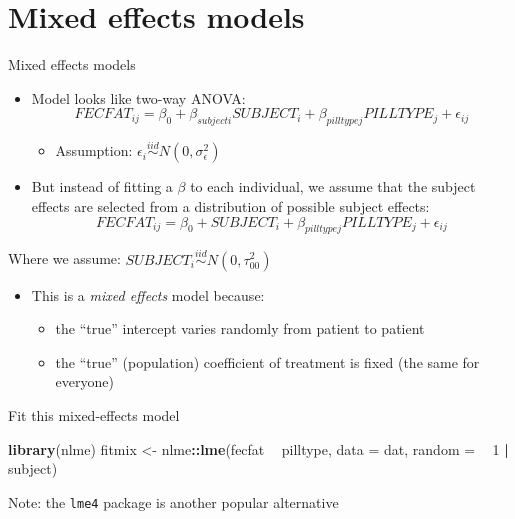 \documentclass[
  ignorenonframetext,
]{beamer}
\newenvironment{Shaded}{\begin{snugshade}}{\end{snugshade}}
\newcommand{\DataTypeTok}[1]{\textcolor[rgb]{0.13,0.29,0.53}{#1}}
\newcommand{\DecValTok}[1]{\textcolor[rgb]{0.00,0.00,0.81}{#1}}
\newcommand{\KeywordTok}[1]{\textcolor[rgb]{0.13,0.29,0.53}{\textbf{#1}}}
\newcommand{\NormalTok}[1]{#1}
\newcommand{\OperatorTok}[1]{\textcolor[rgb]{0.81,0.36,0.00}{\textbf{#1}}}
\newcommand{\StringTok}[1]{\textcolor[rgb]{0.31,0.60,0.02}{#1}}
\providecommand{\tightlist}{%
  \setlength{\itemsep}{0pt}\setlength{\parskip}{0pt}}
\begin{document}
\hypertarget{mixed-effects-models}{%
\section{Mixed effects models}\label{mixed-effects-models}}

\begin{frame}{Mixed effects models}
\protect\hypertarget{mixed-effects-models-1}{}

\begin{itemize}
\tightlist
\item
  Model looks like two-way ANOVA: \[
  FECFAT_{ij} = \beta_0 + \beta_{subject i} SUBJECT_i + \beta_{pilltype j} PILLTYPE_j + \epsilon_{ij}
  \]

  \begin{itemize}
  \tightlist
  \item
    Assumption:
    \(\epsilon_i \stackrel{iid}{\sim} N(0, \sigma_\epsilon^2)\)
  \end{itemize}
\item
  But instead of fitting a \(\beta\) to each individual, we assume that
  the subject effects are selected from a distribution of possible
  subject effects: \[
  FECFAT_{ij} = \beta_0 + SUBJECT_i + \beta_{pilltype j} PILLTYPE_j + \epsilon_{ij}
  \]
\end{itemize}

Where we assume: \(SUBJECT_i \stackrel{iid}{\sim} N(0, \tau_{00}^2)\)

\begin{itemize}
\tightlist
\item
  This is a \emph{mixed effects} model because:

  \begin{itemize}
  \tightlist
  \item
    the ``true'' intercept varies randomly from patient to patient
  \item
    the ``true'' (population) coefficient of treatment is fixed (the
    same for everyone)
  \end{itemize}
\end{itemize}

\end{frame}

\begin{frame}[fragile]{Fit this mixed-effects model}
\protect\hypertarget{fit-this-mixed-effects-model}{}

\begin{Shaded}
\begin{Highlighting}[]
\KeywordTok{library}\NormalTok{(nlme)}
\NormalTok{fitmix <-}\StringTok{ }\NormalTok{nlme}\OperatorTok{::}\KeywordTok{lme}\NormalTok{(fecfat }\OperatorTok{~}\StringTok{ }\NormalTok{pilltype, }
                    \DataTypeTok{data =}\NormalTok{ dat, }
                    \DataTypeTok{random =}  \OperatorTok{~}\StringTok{ }\DecValTok{1} \OperatorTok{|}\StringTok{ }\NormalTok{subject)}
\end{Highlighting}
\end{Shaded}

\tiny

Note: the \texttt{lme4} package is another popular alternative

\end{frame}
\end{document}
